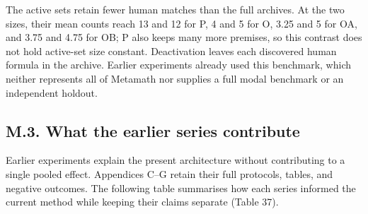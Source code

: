 \documentclass[pdflatex,sn-basic,Numbered]{sn-jnl}
\begin{document}
The active sets retain fewer human matches than the full archives. At the two sizes, their mean counts reach 13 and 12 for P, 4 and 5 for O, 3.25 and 5 for OA, and 3.75 and 4.75 for OB; P also keeps many more premises, so this contrast does not hold active-set size constant. Deactivation leaves each discovered human formula in the archive. Earlier experiments already used this benchmark, which neither represents all of Metamath nor supplies a full modal benchmark or an independent holdout.

\subsection*{M.3. What the earlier series contribute}\label{m.3.-what-the-earlier-series-contribute}

Earlier experiments explain the present architecture without contributing to a single pooled effect. Appendices C--G retain their full protocols, tables, and negative outcomes. The following table summarises how each series informed the current method while keeping their claims separate (Table 37).

\begingroup
\small
\setlength{\tabcolsep}{3pt}
\renewcommand{\arraystretch}{1.13}
\end{document}
